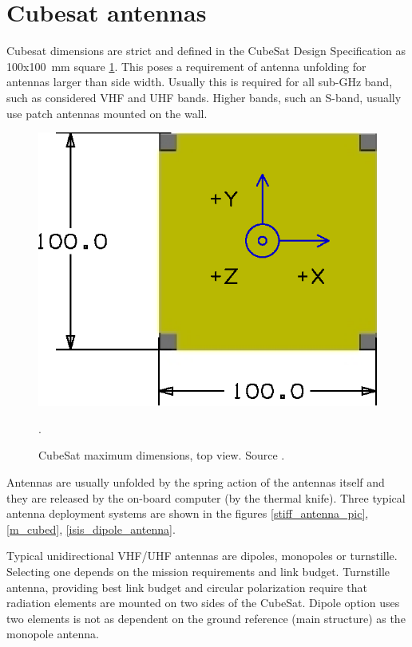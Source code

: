 \section{Cubesat antennas}
Cubesat dimensions are strict and defined in the CubeSat Design Specification \cite{cubesat_spec} as \si{100}x\si{100}~mm square \ref{CubeSat_max_dim}. This poses a requirement of antenna unfolding for antennas larger than side width. Usually this is required for all sub-GHz band, such as considered VHF and UHF bands. Higher bands, such an S-band, usually use patch antennas mounted on the wall.

\begin{figure}[H]
    \centering
    \includegraphics[width=0.5\paperwidth]{img/2/cubesat_dimensions.eps}
    \caption{CubeSat maximum dimensions, top view. Source \cite{cubesat_spec}.}.
    \label{CubeSat_max_dim}
\end{figure}

Antennas are usually unfolded by the spring action of the antennas itself and they are released by the on-board computer (by the thermal knife). Three typical antenna deployment systems are shown in the figures \ref{stiff_antenna_pic}, \ref{m_cubed}, \ref{isis_dipole_antenna}.

Typical unidirectional VHF/UHF antennas are dipoles, monopoles or turnstille. Selecting one depends on the mission requirements and link budget. Turnstille antenna, providing best link budget and circular polarization require that radiation elements are mounted on two sides of the CubeSat. Dipole option uses two elements is not as dependent on the ground reference (main structure) as the monopole antenna.

